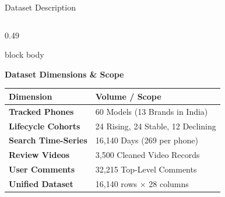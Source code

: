 \documentclass[aspectratio=169, 10pt]{beamer}
\newenvironment{card}[1][]{%
    \begin{beamercolorbox}[rounded=true,shadow=false,wd=\linewidth,sep=4pt,#1]{block body}%
}{%
    \end{beamercolorbox}%
}
\begin{document}
\begin{frame}{Dataset Description}
    \begin{columns}[T]
        \begin{column}{0.49\textwidth}
            \begin{card}
                {\fontsize{8.5pt}{10pt}\selectfont \textbf{\color{NavyPrimary}Dataset Dimensions \& Scope}}\\[0.08cm]
                \scriptsize
                \begin{tabular}{p{3.0cm}p{3.2cm}}
                    \toprule
                    \textbf{Dimension} & \textbf{Volume / Scope} \\
                    \midrule
                    \textbf{Tracked Phones} & 60 Models (13 Brands in India) \\
                    \textbf{Lifecycle Cohorts} & 24 Rising, 24 Stable, 12 Declining \\
                    \textbf{Search Time-Series} & 16,140 Days (269 per phone) \\
                    \textbf{Review Videos} & 3,500 Cleaned Video Records \\
                    \textbf{User Comments} & 32,215 Top-Level Comments \\
                    \textbf{Unified Dataset} & 16,140 rows $\times$ 28 columns \\
                    \bottomrule
                \end{tabular}
            \end{card}
        \end{column}


\end{columns}
\end{frame}
\end{document}
